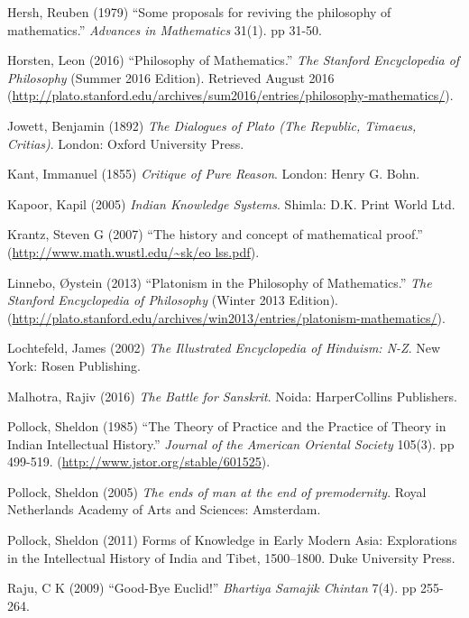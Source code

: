 \begin{thebibliography}{99}
Hersh, Reuben (1979) ``Some proposals for reviving the philosophy of mathematics.'' {\sl Advances in Mathematics} 31(1). pp 31-50.

Horsten, Leon (2016) ``Philosophy of Mathematics.'' {\sl The Stanford Encyclopedia of Philosophy} (Summer 2016 Edition). Retrieved August 2016 (\url{http://plato.stanford.edu/archives/sum2016/entries/philosophy-mathematics/}).

Jowett, Benjamin (1892) {\sl The Dialogues of Plato (The Republic, Timaeus, Critias)}. London: Oxford University Press.

Kant, Immanuel (1855) {\sl Critique of Pure Reason}. London: Henry G. Bohn. 

Kapoor, Kapil (2005) {\sl Indian Knowledge Systems}. Shimla: D.K. Print World Ltd.

Krantz, Steven G (2007) ``The history and concept of mathematical proof.'' (\url{http://www.math.wustl.edu/~sk/eo lss.pdf}). 

Linnebo, Øystein (2013) ``Platonism in the Philosophy of Mathematics.'' {\sl The Stanford Encyclopedia of Philosophy} (Winter 2013 Edition). (\url{http://plato.stanford.edu/archives/win2013/entries/platonism-mathematics/}).

Lochtefeld, James (2002) {\sl The Illustrated Encyclopedia of Hinduism: N-Z}. New York: Rosen Publishing.

Malhotra, Rajiv (2016) {\sl The Battle for Sanskrit}. Noida: HarperCollins Publishers.

Pollock, Sheldon (1985) ``The Theory of Practice and the Practice of Theory in Indian Intellectual History.'' {\sl Journal of the American Oriental Society} 105(3). pp 499-519. (\url{http://www.jstor.org/stable/601525}).

Pollock, Sheldon (2005) {\sl The ends of man at the end of premodernity}. Royal Netherlands Academy of Arts and Sciences: Amsterdam.

Pollock, Sheldon (2011) Forms of Knowledge in Early Modern Asia: Explorations in the Intellectual History of India and Tibet, 1500--1800. Duke University Press.

Raju, C K (2009) ``Good-Bye Euclid!'' {\sl Bhartiya Samajik Chintan} 7(4). pp 255-264.


\end{thebibliography}
